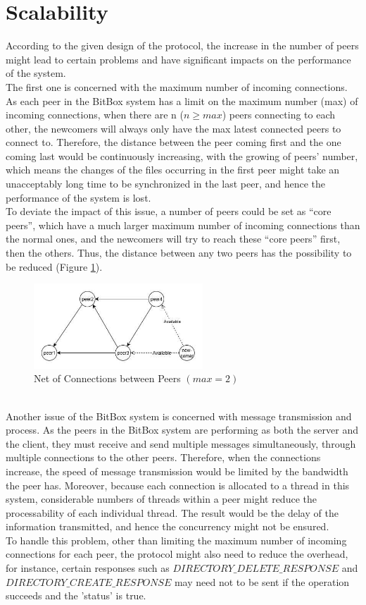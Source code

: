\documentclass[a4paper,10pt,titlepage,twocolumn]{article}
\begin{document}
    \section*{Scalability}
    According to the given design of the protocol, the increase in the number of peers might lead to certain problems and have significant impacts on the performance of the system.
    \\The first one is concerned with the maximum number of incoming connections. As each peer in the BitBox system has a limit on the maximum number (max) of incoming connections, when there are n ($n \geq max$) peers connecting to each other, the newcomers will always only have the max latest connected peers to connect to. Therefore, the distance between the peer coming first and the one coming last would be continuously increasing, with the growing of peers’ number, which means the changes of the files occurring in the first peer might take an unacceptably long time to be synchronized in the last peer, and hence the performance of the system is lost.
    \\To deviate the impact of this issue, a number of peers could be set as “core peers”, which have a much larger maximum number of incoming connections than the normal ones, and the newcomers will try to reach these “core peers” first, then the others. Thus, the distance between any two peers has the possibility to be reduced (Figure \ref{fig:1}).
    \begin{figure}[htbp] 
        \centering\includegraphics[width=2.5in]{picture.jpg} 
        \caption{Net of Connections between Peers $(max = 2)$}\label{fig:1} 
    \end{figure} 
    \\Another issue of the BitBox system is concerned with message transmission and process. As the peers in the BitBox system are performing as both the server and the client, they must receive and send multiple messages simultaneously, through multiple connections to the other peers. Therefore, when the connections increase, the speed of message transmission would be limited by the bandwidth the peer has. Moreover, because each connection is allocated to a thread in this system, considerable numbers of threads within a peer might reduce the processability of each individual thread. The result would be the delay of the information transmitted, and hence the concurrency might not be ensured.
    \\To handle this problem, other than limiting the maximum number of incoming connections for each peer, the protocol might also need to reduce the overhead, for instance, certain responses such as $DIRECTORY\_DELETE\_RESPONSE$ and $DIRECTORY\_CREATE\_RESPONSE$ may need not to be sent if the operation succeeds and the 'status' is true.
\end{document}
